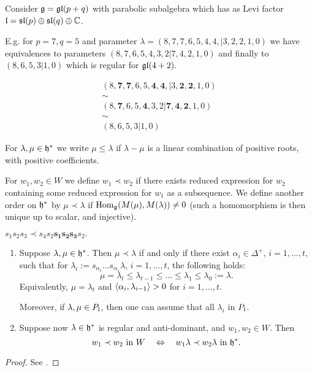 \documentclass[a4paper,10pt]{article}
\begin{document}
\begin{example}[ES equivalence]
 Consider $\mathfrak{g} = \mathfrak{gl}(p+q)$ with parabolic subalgebra which has as Levi factor $\mathfrak{l} = \mathfrak{sl}(p)\oplus \mathfrak{sl}(q) \oplus \mathbb{C}$. 
 
 E.g. for $p=7, q=5$ and parameter $\lambda = (8,7,7,6,5,4,4,|3,2,2,1,0)$ we have equivalences to parameters $(8,7,6,5,4,3,2 | 7,4,2,1,0)$ and finally to  $(8,6,5,3 | 1, 0)$ which is regular for $\mathfrak{gl}(4+2).$
 
 \begin{gather*}
  (8,\pmb{7},\pmb{7},6,5,\pmb{4},\pmb{4},|3,\pmb{2},\pmb{2},1,0) \\
  \sim \\
  (8,\pmb{7},6,5,\pmb{4},3,2 | \pmb{7},\pmb{4},\pmb{2},1,0) \\
  \sim \\
  (8,6,5,3 | 1, 0)
 \end{gather*}

\end{example}

For $\lambda,\mu \in \mathfrak{h}^\ast$ we write $\mu \leq \lambda$ if $\lambda - \mu$ is a linear combination of positive roots, with positive coefficients.

\begin{definition}
For $w_1, w_2 \in W$ we define $w_1 \prec w_2$ if there exists reduced expression for $w_2$ containing some reduced expression for $w_1$ as a subsequence. We define another order on $\mathfrak{h}^*$ by $ \mu \prec  \lambda$  if $\mathrm{Hom}_{\mathfrak{g}}(M(\mu), M(\lambda)) \neq 0$ (such a homomorphism is then unique up to scalar, and injective).
\end{definition}
%
\begin{example}
$  s_1s_2s_3 \prec s_4s_2 \pmb{s_1s_2s_3} s_2.$
 \end{example}
%
\begin{lemma}
\begin{enumerate}
\item Suppose $\lambda, \mu \in \mathfrak{h}^\ast$. Then $\mu \prec \lambda$ if and only if there exist $\alpha_i \in \Delta^+$, $i=1,\ldots,t$, such that for $\lambda_i := s_{\alpha_i} \ldots s_{\alpha_1} \lambda$, $i=1,\ldots,t$, the following holds:
%
\[ \mu = \lambda_t \leq \lambda_{t-1} \leq \ldots \leq \lambda_1 \leq \lambda_0 := \lambda. \]
%
Equivalently, $\mu = \lambda_t$ and $\langle \alpha_{i}, \lambda_{i-1} \rangle>0$ for $i=1,\ldots,t$.

Moreover, if $\lambda, \mu \in P_{\mathfrak{l}}$, then one can assume that all $\lambda_i$ in $P_{\mathfrak{l}}$.

\item Suppose now $\lambda \in \mathfrak{h}^\ast$ is regular and anti-dominant, and $w_1,w_2 \in W$. Then
%
\[ w_1 \prec w_2 \text{ in $W$} \quad \Leftrightarrow \quad w_1 \lambda \prec w_2 \lambda \text{ in $\mathfrak{h}^\ast$}.\]
\end{enumerate}
\end{lemma}
%
\begin{proof}
See \cite[Chapters 4. and 5.]{hum}.
\end{proof}
\end{document}
